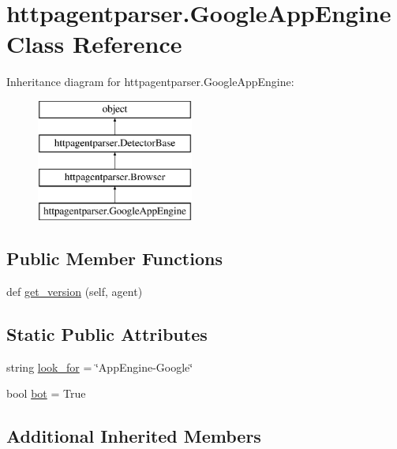 \hypertarget{classhttpagentparser_1_1_google_app_engine}{}\section{httpagentparser.\+Google\+App\+Engine Class Reference}
\label{classhttpagentparser_1_1_google_app_engine}
Inheritance diagram for httpagentparser.\+Google\+App\+Engine\+:\begin{figure}[H]
\begin{center}
\leavevmode
\includegraphics[height=4.000000cm]{classhttpagentparser_1_1_google_app_engine}
\end{center}
\end{figure}
\subsection*{Public Member Functions}
\begin{DoxyCompactItemize}
\item 
def \hyperlink{classhttpagentparser_1_1_google_app_engine_a81ab551ca71245743c9a20a1c53550e6}{get\+\_\+version} (self, agent)
\end{DoxyCompactItemize}
\subsection*{Static Public Attributes}
\begin{DoxyCompactItemize}
\item 
string \hyperlink{classhttpagentparser_1_1_google_app_engine_a4e628c81f7a56fddcfb772393a19bd05}{look\+\_\+for} = \char`\"{}App\+Engine-\/Google\char`\"{}
\item 
bool \hyperlink{classhttpagentparser_1_1_google_app_engine_ab435728ddc372e1ef8050c7ea52ae815}{bot} = True
\end{DoxyCompactItemize}
\subsection*{Additional Inherited Members}


